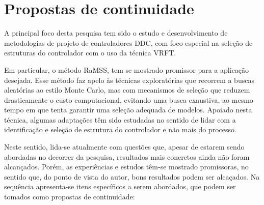 \section{Propostas de continuidade}\label{sec:Prop_cont}

A principal foco desta pesquisa tem sido o estudo e desenvolvimento de metodologias de projeto de controladores DDC, com foco especial na seleção de estruturas do controlador com o uso da técnica VRFT.

Em particular, o método RaMSS, tem se mostrado promissor para a aplicação desejada. Esse método faz apelo às técnicas exploratórias que recorrem a buscas aleatórias ao estilo Monte Carlo, mas com mecanismos de seleção que reduzem drasticamente o custo computacional, evitando uma busca exaustiva, ao mesmo tempo em que tenta garantir uma seleção adequada de modelos.
%
Apoiado nesta técnica, algumas adaptações têm sido estudadas no sentido de lidar com a identificação e seleção de estrutura do controlador e não mais do processo.

Neste sentido, lida-se atualmente com questões que, apesar de estarem sendo abordadas no decorrer da pesquisa, resultados mais concretos ainda não foram alcançados.
Porém, as experiências e estudos têm-se mostrado promissoras, no sentido que, do ponto de vista do autor, bons resultados podem ser alcaçados.
Na sequência apresenta-se itens específicos a serem abordados, que podem ser tomados como propostas de continuidade:


